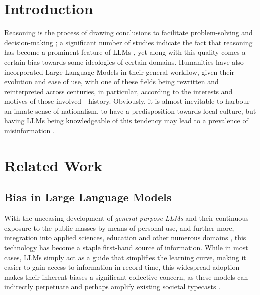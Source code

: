 \documentclass[11pt]{article}
\begin{document}
\section{Introduction}
Reasoning is the process of drawing conclusions to facilitate problem-solving and decision-making \cite{leighton2003}; a significant number of studies indicate the fact that reasoning has become a prominent feature of LLMs \cite{chandra2025}, yet along with this quality comes a certain bias towards some ideologies of certain domains. Humanities have also incorporated Large Language Models in their general workflow, given their evolution and ease of use, with one of these fields being rewritten and reinterpreted across centuries, in particular, according to the interests and motives of those involved - history. Obviously, it is almost inevitable to harbour an innate sense of nationalism, to have a predisposition towards local culture, but having LLMs being knowledgeable of this tendency may lead to a prevalence of misinformation \cite{cichocka2020}. 


\section{Related Work}
\subsection{Bias in Large Language Models}
With the unceasing development of \textit{general-purpose LLMs} and their continuous exposure to the public masses by means of personal use, and further more, integration into applied sciences, education and other numerous domains \cite{guo2024}, this technology has become a staple first-hand source of information. While in most cases, LLMs simply act as a guide that simplifies the learning curve, making it easier to gain access to information in record time, this widespread adoption makes their inherent biases a significant collective concern, as these models can indirectly perpetuate and perhaps amplify existing societal typecasts \cite{kumar2024}.
\end{document}

